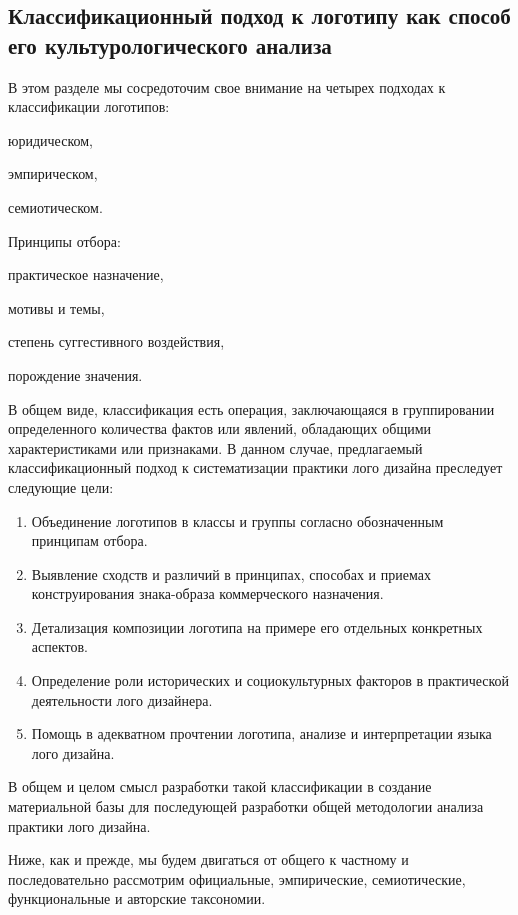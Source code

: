 \subsection{Классификационный подход к логотипу как способ его культурологического анализа}

В этом разделе мы сосредоточим свое внимание на четырех подходах к классификации логотипов:
\begin{enumerate*}[label=\arabic*)]
\item юридическом,
\item эмпирическом,
\item семиотическом.
\end{enumerate*}
Принципы отбора:
\begin{enumerate*}[label=\asbuk*)]
\item практическое назначение,
\item мотивы и темы,
\item степень суггестивного воздействия,
\item порождение значения.
\end{enumerate*}

В общем виде, классификация есть операция, заключающаяся в группировании определенного количества
фактов или явлений, обладающих общими характеристиками или признаками. В данном случае, предлагаемый
классификационный подход к систематизации практики лого дизайна преследует следующие цели:
\begin{enumerate}
\item Объединение логотипов в классы и группы согласно обозначенным принципам отбора.
\item Выявление сходств и различий в принципах, способах и приемах конструирования знака-образа коммерческого назначения.
\item Детализация композиции логотипа на примере его отдельных конкретных аспектов.
\item Определение роли исторических и социокультурных факторов в практической деятельности лого дизайнера.
\item Помощь в адекватном прочтении логотипа, анализе и интерпретации языка лого дизайна.
\end{enumerate}

В общем и целом смысл разработки такой классификации в создание материальной базы для последующей
разработки общей методологии анализа практики лого дизайна.

Ниже, как и прежде, мы будем двигаться от общего к частному и последовательно рассмотрим
официальные, эмпирические, семиотические, функциональные и авторские таксономии.

